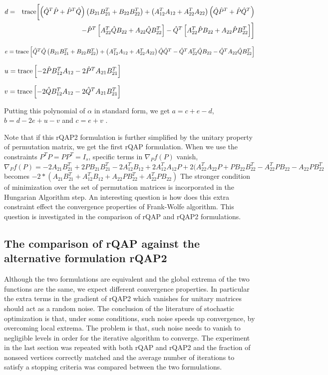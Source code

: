 \documentclass[12pt,oneside,final]{thesis}\usepackage[]{graphicx}\usepackage[]{color}
\begin{document}
\noindent 
\begin{eqnarray*}
d & = & \textup{trace}\biggl[\left(\hat{Q}^{T}\hat{P}+\hat{P}^{T}\hat{Q}\right)\left(B_{21}B_{21}^{T}+B_{22}B_{22}^{T}\right)+\left(A_{12}^{T}A_{12}+A_{22}^{T}A_{22}\right)\left(\hat{Q}\hat{P}^{T}+\hat{P}\hat{Q}^{T}\right)\\
 &  & -\hat{P}^{T}\left[A_{22}^{T}\hat{Q}B_{22}+A_{22}\hat{Q}B_{22}^{T}\right]-\hat{Q}^{T}\left[A_{22}^{T}\hat{P}B_{22}+A_{22}\hat{P}B_{22}^{T}\right]\biggr]
\end{eqnarray*}


$e=\textup{trace}\left[\hat{Q}^{T}\hat{Q}\left(B_{21}B_{21}^{T}+B_{22}B_{22}^{T}\right)+\left(A_{12}^{T}A_{12}+A_{22}^{T}A_{22}\right)\hat{Q}\hat{Q}^{T}-\hat{Q}^{T}A_{22}^{T}\hat{Q}B_{22}-\hat{Q}^{T}A_{22}\hat{Q}B_{22}^{T}\right]$

$u=\textup{trace}\left[-2\hat{P}B_{12}^{T}A_{12}-2\hat{P}^{T}A_{21}B_{21}^{T}\right]$

$v=\textup{trace}\left[-2\hat{Q}B_{12}^{T}A_{12}-2\hat{Q}^{T}A_{21}B_{21}^{T}\right]$

Putting this polynomial of $\alpha$ in standard form, we get $a=c+e-d$,
$b=d-2e+u-v$ and $c=e+v$ .

Note that if this rQAP2 formulation is further simplified  by the unitary property of permutation  matrix, we get the first rQAP formulation. When we use the constraints $P^TP=PP^T=I_{s}$, specific terms in $\nabla_{P}f(P)$ vanish,
$\nabla_{P}f(P)=-2A_{21}B_{21}^{T}+2PB_{21}B_{21}^{T}-2A_{12}^{T}B_{12}+2A_{12}^{T}A_{12}P+2(A_{22}^{T}A_{22}P+PB_{22}B_{22}^{T}-A_{22}^{T}PB_{22}-A_{22}PB_{22}^{T}$
becomes $-2*(A_{21}B_{21}^T+A_{12}^TB_{12}+A_{22}PB_{22}^T+A_{22}^TPB_{22})$
The stronger condition of minimization over the set of permutation matrices is incorporated in the Hungarian Algorithm step.
An interesting question is how does this extra constraint effect the convergence properties of Frank-Wolfe algorithm.  This question is investigated in the comparison of rQAP and rQAP2 formulations.  

\subsection{The comparison of rQAP against the alternative formulation rQAP2}
Although the two formulations are equivalent and the global extrema of the two functions are the same, we expect different convergence  properties. In particular the extra terms in the gradient of rQAP2 which vanishes for unitary matrices should act as a random noise. The conclusion of the literature of stochastic optimization  is that, under some conditions, such noise speeds up convergence, by overcoming local extrema. The problem is that, such noise needs to vanish to negligible levels in order for the iterative algorithm to converge. 
The experiment in the last  section was repeated with both rQAP and rQAP2 and the fraction of nonseed vertices correctly matched and the average number of iterations to satisfy a stopping criteria was compared between the two formulations. 
\end{document}

